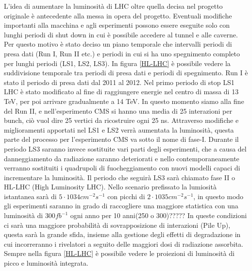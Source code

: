 L'idea di aumentare la luminosità di LHC oltre quella decisa nel progetto originale è antecedente alla messa in opera del progetto. Eventuali modifiche importanti alla macchina e agli esperimenti possono essere eseguite solo con lunghi periodi di shut down in cui è possibile accedere al tunnel e alle caverne. Per questo motivo è stato deciso un piano temporale che intervalli periodi di presa dati (Run I, Run II etc.) e periodi in cui si ha uno spegnimento completo per lunghi periodi (LS1, LS2, LS3). In figura \ref{HL-LHC} è possibile vedere la suddivisione temporale tra periodi di presa dati e periodi di spegnimento.
Run I è stato il periodo di presa dati dal 2011 al 2012. Nel primo periodo di stop LS1 LHC è stato modificato al fine di raggiungere energie  nel centro di massa di 13 TeV, per poi arrivare gradualmente a 14 TeV. In questo momento siamo alla fine del Run II, e nell'esperimento CMS si  hanno una media di 25 interazioni per bunch, ciò vuol dire 25 vertici da ricostruire ogni 25 ns. Attraverso modifiche  e miglioramenti apportati nel LS1 e LS2 verrà aumentata la luminosità, questa parte del processo per l'esperimento CMS va sotto il nome di fase-I. Durante il periodo LS3  saranno invece sostituite vari parti degli esperimenti, che a causa del danneggiamento da radiazione saranno deteriorati e nello contemporaneamente verranno sostituiti i quadrupoli di fuocheggiamento con nuovi modelli capaci di incrementare la luminosità. 
Il periodo che seguirà LS3 sarà chiamato fase II o HL-LHC (High Luminosity LHC). Nello scenario prefissato la lumiosità istantanea sarà di $5 \cdot 10 34 cm^{-2} s^{-1}$ con picchi di $2 \cdot 10 35 cm^{-2} s^{-1}$, in questo modo gli esperimenti saranno in grado di raccogliere una maggiore statistica con una luminosità di $300 fb^{-1}$ ogni anno per 10 anni(250 o 300)?????%
In queste condizioni ci sarà una maggiore probabilità di sovrapposizione di interazioni (Pile Up), questa sarà la grande sfida, insieme alla gestione degli effetti di degradazione in cui incorreranno i rivelatori a seguito delle maggiori dosi di radiazione assorbita. Sempre nella figura \ref{HL-LHC} è possibile vedere le proiezioni di luminosità di picco e luminosità integrata.
 

